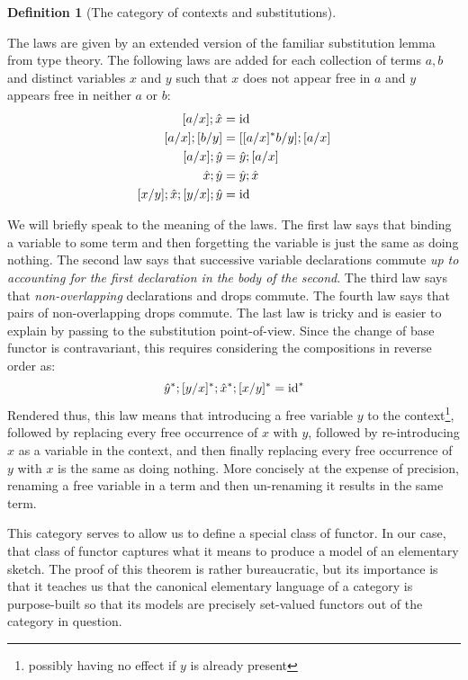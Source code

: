 \documentclass[12pt,twoside]{reedthesis}
\theoremstyle{definition}
\newtheorem{definition}{Definition}
\theoremstyle{remark}
\theoremstyle{plain}
\begin{document}
\begin{definition}[The category of contexts and substitutions]
\begin{outline}
    \1 The laws are given by an extended version of the familiar substitution
    lemma from type theory. The following laws are added for each collection of
    terms $a,b$ and distinct variables $x$ and $y$ such that $x$ does not appear
    free in $a$ and $y$ appears free in neither $a$ or $b$:
    \begin{align*}
      [a/x] ; \hat{x} &= \textrm{id} \\
      [a/x] ; [b/y]   &= [ [ a/x ]^{*} b/y ] ; [a/x] \\
      [a/x]; \hat{y} &= \hat{y}; [a/x] \\
      \hat{x}; \hat{y} &= \hat{y}; \hat{x} \\
      [x/y]; \hat{x}; [y/x]; \hat{y} &= \textrm{id}
    \end{align*}
  \end{outline}
  We will briefly speak to the meaning of the laws. The first law says that
  binding a variable to some term and then forgetting the variable is just the
  same as doing nothing. The second law says that successive variable
  declarations commute \emph{up to accounting for the first declaration in the
    body of the second}. The third law says that \emph{non-overlapping}
  declarations and drops commute. The fourth law says that pairs of
  non-overlapping drops commute. The last law is tricky and is easier to explain
  by passing to the substitution point-of-view. Since the change of base functor
  is contravariant, this requires considering the compositions in reverse order
  as:
  \[ \hat{y}^{*}; [y/x]^{*}; \hat{x}^{*}; [x/y]^{*} = {\textrm{id}}^{*} \] Rendered
  thus, this law means that introducing a free variable $y$ to the
  context\footnote{possibly having no effect if $y$ is already present},
  followed by replacing every free occurrence of $x$ with $y$, followed by
  re-introducing $x$ as a variable in the context, and then finally replacing
  every free occurrence of $y$ with $x$ is the same as doing nothing. More
  concisely at the expense of precision, renaming a free variable in a term and
  then un-renaming it results in the same term.
\end{definition}

This category serves to allow us to define a special class of functor. In our
case, that class of functor captures what it means to produce a model of an
elementary sketch. The proof of this theorem is rather bureaucratic, but its
importance is that it teaches us that the canonical elementary language of a
category is purpose-built so that its models are precisely set-valued functors
out of the category in question.
\end{document}
